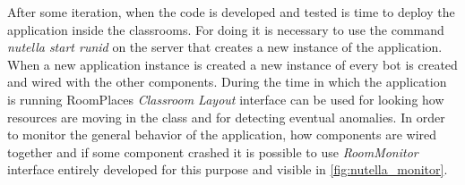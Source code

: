 After some iteration, when the code is developed and tested is time to deploy the application inside the classrooms. For doing it is necessary to use the command \textit{nutella start runid} on the server that creates a new instance of the application. When a new application instance is created a new instance of every bot is created and wired with the other components. During the time in which the application is running RoomPlaces \textit{Classroom Layout} interface can be used for looking how resources are moving in the class and for detecting eventual anomalies. In order to monitor the general behavior of the application, how components are wired together and if some component crashed it is possible to use \textit{RoomMonitor} interface entirely developed for this purpose and visible in \ref{fig:nutella_monitor}.
